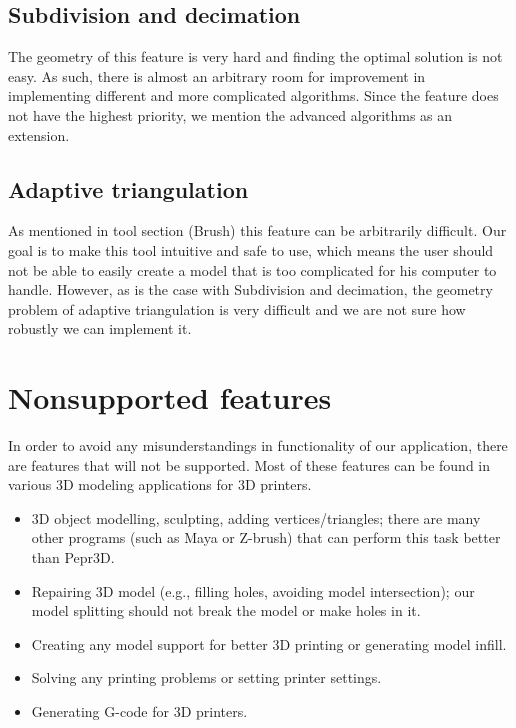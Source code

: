 \subsection{Subdivision and decimation}

The geometry of this feature is very hard and finding the optimal solution is not easy. As such, there is almost an arbitrary room for improvement in implementing different and more complicated algorithms. Since the feature does not have the highest priority, we mention the advanced algorithms as an extension.

\subsection{Adaptive triangulation}

As mentioned in tool section (Brush) this feature can be arbitrarily difficult. Our goal is to make this tool intuitive and safe to use, which means the user should not be able to easily create a model that is too complicated for his computer to handle. However, as is the case with Subdivision and decimation, the geometry problem of adaptive triangulation is very difficult and we are not sure how robustly we can implement it.


\section{Nonsupported features}

In order to avoid any misunderstandings in functionality of our application, there are features that will not be supported. Most of these features can be found in various 3D modeling applications for 3D printers.

\begin{itemize}
\item 3D object modelling, sculpting, adding vertices/triangles; there are many other programs (such as Maya or Z-brush) that can perform this task better than Pepr3D.
\item Repairing 3D model (e.g., filling holes, avoiding model intersection); our model splitting should not break the model or make holes in it.
\item Creating any model support for better 3D printing or generating model infill.
\item Solving any printing problems or setting printer settings.
\item Generating G-code for 3D printers.
\end{itemize}










